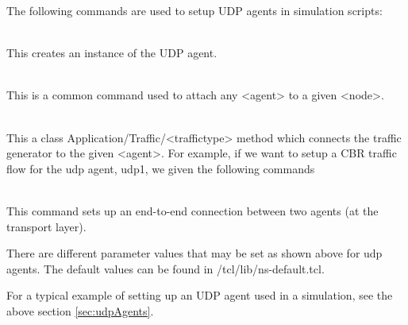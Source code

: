 The following commands are used to setup UDP agents in simulation scripts:
\begin{flushleft}
\\
This creates an instance of the UDP agent.


\\
This is a common command used to attach any <agent> to a given <node>.


\\
This a class Application/Traffic/<traffictype> method which connects the
traffic generator to the given <agent>. For example, if we want to setup
a CBR traffic flow for the udp agent, udp1, we given the following commands\\


\\
This command sets up an end-to-end connection between two agents (at the
transport layer).



There are different parameter values that may be set as shown above for udp
agents. The default values can be found in \ns/tcl/lib/ns-default.tcl.

For a typical example of setting up an UDP agent used in a simulation, see
the above section \ref{sec:udpAgents}.

\end{flushleft}

\endinput
